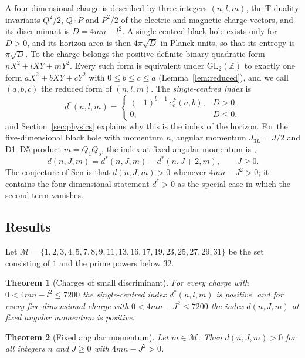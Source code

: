 \documentclass[11pt]{amsart}
\newtheorem{mainthm}{Theorem}
\theoremstyle{definition}
\newcommand{\ZZ}{\mathbb{Z}}
\newcommand{\cF}{c^{F}}
\newcommand{\dstar}{d^{*}}
\newcommand{\Mset}{\mathcal{M}}
\begin{document}
A four-dimensional charge is described by three integers $(n,l,m)$, the T-duality invariants $Q^2/2$, $Q\cdot P$ and $P^2/2$ of the electric and magnetic charge vectors, and its discriminant is $D=4mn-l^2$. A single-centred black hole exists only for $D>0$, and its horizon area is then $4\pi\sqrt{D}$ in Planck units, so that its entropy is $\pi\sqrt D$. To the charge belongs the positive definite binary quadratic form $nX^2+lXY+mY^2$. Every such form is equivalent under $\mathrm{GL}_2(\ZZ)$ to exactly one form $aX^2+bXY+cY^2$ with $0\le b\le c\le a$ (Lemma~\ref{lem:reduced}), and we call $(a,b,c)$ the reduced form of $(n,l,m)$. The \emph{single-centred index} is
\begin{equation}\label{eq:dstar}
\dstar(n,l,m)=\begin{cases}(-1)^{b+1}\,\cF_c(a,b), & D>0,\\ 0,& D\le0,\end{cases}
\end{equation}
and Section~\ref{sec:physics} explains why this is the index of the horizon. For the five-dimensional black hole with momentum $n$, angular momentum $J_{3L}=J/2$ and D1--D5 product $m=Q_1Q_5$, the index at fixed angular momentum is \cite{Sen12}, \cite[\S2.3, \S3.1]{BM13}
\begin{equation}\label{eq:drot}
d(n,J,m)=\dstar(n,J,m)-\dstar(n,J+2,m),\qquad J\ge0 .
\end{equation}
The conjecture of Sen is that $d(n,J,m)>0$ whenever $4mn-J^2>0$; it contains the four-dimensional statement $\dstar>0$ as the special case in which the second term vanishes.

\subsection*{Results}
Let $\Mset=\{1,2,3,4,5,7,8,9,11,13,16,17,19,23,25,27,29,31\}$ be the set consisting of $1$ and the prime powers below $32$.

\begin{mainthm}[Charges of small discriminant]\label{thm:A}
For every charge with $0<4mn-l^2\le7200$ the single-centred index $\dstar(n,l,m)$ is positive, and for every five-dimensional charge with $0<4mn-J^2\le7200$ the index $d(n,J,m)$ at fixed angular momentum is positive.
\end{mainthm}

\begin{mainthm}[Fixed angular momentum]\label{thm:B}
Let $m\in\Mset$. Then $d(n,J,m)>0$ for all integers $n$ and $J\ge0$ with $4mn-J^2>0$.
\end{mainthm}
\end{document}
